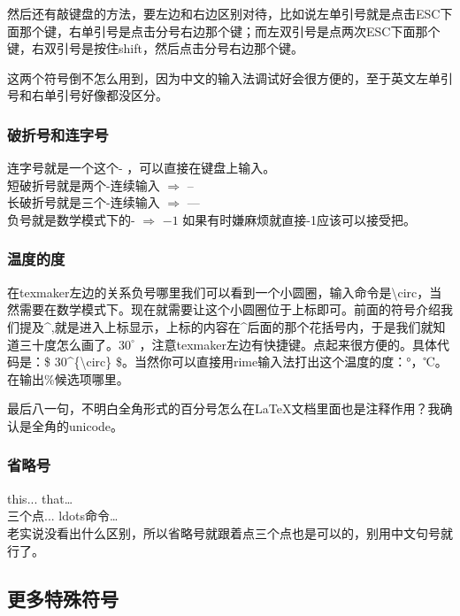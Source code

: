 \documentclass[11pt,oneside]{book}
\begin{document}
\begin{common-format}
然后还有敲键盘的方法，要左边和右边区别对待，比如说左单引号就是点击ESC下面那个键，右单引号是点击分号右边那个键；而左双引号是点两次ESC下面那个键，右双引号是按住shift，然后点击分号右边那个键。

这两个符号倒不怎么用到，因为中文的输入法调试好会很方便的，至于英文左单引号和右单引号好像都没区分。

\subsubsection{破折号和连字号}
连字号就是一个这个- ，可以直接在键盘上输入。\\
短破折号就是两个-连续输入 $ \Longrightarrow $  --\\
长破折号就是三个-连续输入 $ \Longrightarrow $  ---\\
负号就是数学模式下的-  $ \Longrightarrow $ $ -1 $  如果有时嫌麻烦就直接-1应该可以接受把。

%
%
\subsubsection{温度的度}
在texmaker左边的关系负号哪里我们可以看到一个小圆圈，输入命令是\textbackslash circ，当然需要在数学模式下。现在就需要让这个小圆圈位于上标即可。前面的符号介绍我们提及\^{},就是进入上标显示，上标的内容在\^{}后面的那个花括号内，于是我们就知道三十度怎么画了。$ 30^{\circ} $ ，注意texmaker左边有快捷键。点起来很方便的。具体代码是：\$ 30\^{}\{\textbackslash circ\} \$。当然你可以直接用rime输入法打出这个温度的度：°，℃。在输出\%候选项哪里。

最后八一句，不明白全角形式的百分号怎么在\LaTeX 文档里面也是注释作用？我确认是全角的unicode。

\subsubsection{省略号}
this...   that\ldots   \\
三个点...   ldots命令\ldots  \\
老实说没看出什么区别，所以省略号就跟着点三个点也是可以的，别用中文句号就行了。



\subsection{更多特殊符号}
{\fontsize{50pt}{10pt}\selectfont \color[HTML]{DE4815}  }


\end{common-format}
\end{document}
